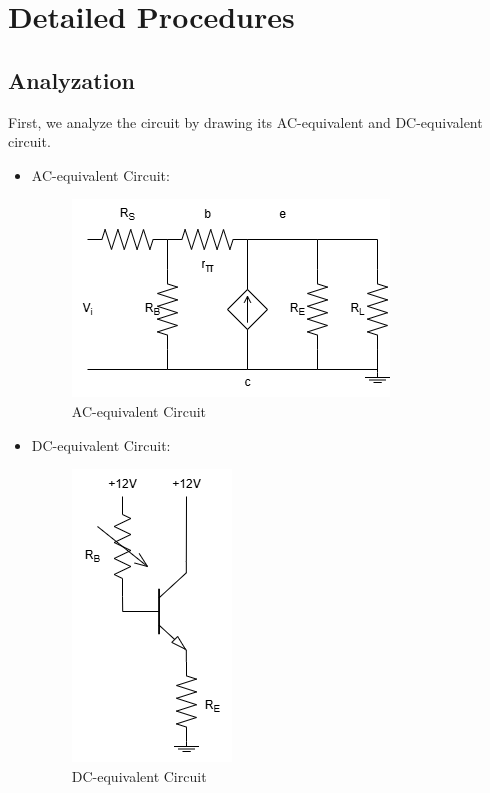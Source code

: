 \section{Detailed Procedures}
    \subsection{Analyzation}
    First, we analyze the circuit by drawing its AC-equivalent and DC-equivalent circuit.\par
    \begin{itemize}
        \item AC-equivalent Circuit:\par
            \begin{figure}[h]
                \centering
                \includegraphics[width=0.65\linewidth]{Lab07/Lab7ac.drawio.png}
                \caption{AC-equivalent Circuit}
                \label{l7ac}
            \end{figure}
            \FloatBarrier
        \item DC-equivalent Circuit:\par
            \begin{figure}[h]
                \centering
                \includegraphics[width=0.3\linewidth]{Lab07/Lab7dc.drawio.png}
                \caption{DC-equivalent Circuit}
                \label{l7dc}
            \end{figure}
            \FloatBarrier
    \end{itemize}
